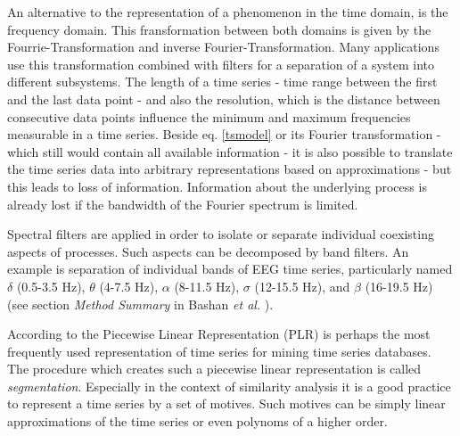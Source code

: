 \documentclass[a4paper,10pt]{scrbook}
\begin{document}
An alternative to the representation of a phenomenon in the time domain, is the frequency domain. This fransformation between both domains is given by the Fourrie-Transformation and inverse Fourier-Transformation. Many applications use this transformation combined with filters for a separation of a system into different subsystems. The length of a time series - time range between the first and the last data point - and also the resolution, which is the distance between consecutive data points influence the minimum and maximum frequencies measurable in a time series. 
Beside eq. \ref{tsmodel} or its Fourier transformation - which still would contain all available information - it is also possible to translate the time series data into arbitrary representations based on approximations - but this leads to loss of information. Information about the underlying process is already lost if the bandwidth of the Fourier spectrum is limited. 

Spectral filters are applied in order to isolate or separate individual coexisting aspects of processes. Such aspects can be decomposed by band filters. An example is separation of individual bands of EEG time series, particularly named $\delta$ (0.5-3.5 Hz), $\theta$ (4-7.5 Hz), $\alpha$ (8-11.5 Hz), $\sigma$ (12-15.5 Hz), and $\beta$ (16-19.5 Hz) (see section \textit{Method Summary} in Bashan \textit{et al.} \cite{Bashan2012}).

According to \cite{Keogh93segmentingtime} the Piecewise Linear Representation (PLR) is perhaps the most frequently used representation of time series for mining time series databases. The procedure which creates such a piecewise linear representation is called \textit{segmentation}. Especially in the context of similarity analysis it is a good practice to represent a time series by a set of motives. Such motives can be simply linear approximations of the time series or even polynoms of a higher order. 
\end{document}
